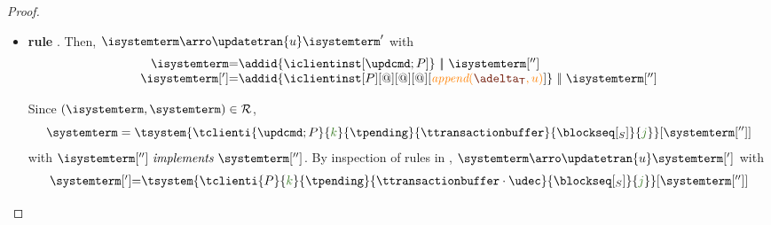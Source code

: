 \begin{proof}
\begin{itemize}
		
			
			\begin{itemize}
\item {\bf rule }. Then, $\isystemterm  \arroi{\updatetran{u}} \isystemterm '$ with 
				\[\begin{array}{r@{=}l}
					\isystemterm & \addid{\iclientinst[\tupdateins]} \ \bigpar \ \isystemterm['']
					\\
					\isystemterm['] & \addid{\iclientinst[P][@][@][@][\iappend{\transactionbuffer}{u}]} \ \bigpar \   \isystemterm['']	
				  \end{array}
				\]
				
				Since $(\isystemterm,\systemterm)\in \mathcal{R}$,
				\[\systemterm = \tsystem{\tclienti{\tupdateins}{\tknown}{\tpending}{\ttransactionbuffer}{\tsent}{\treceivebuffer}}[{\systemterm['']}] \]
				with $\implements{\isystemterm['']}{\systemterm['']}$. By inspection of rules in , 
				$\systemterm \arroi{\updatetran{u}} \systemterm[']$ with
				\[\begin{array}{r@{=}l}
						\systemterm['] & \tsystem{\tclienti{\tprogram}{\tknown}{\tpending}{\ttransactionbuffer \cdot \tupdate}{\tsent}{\treceivebuffer}}[{\systemterm['']}]	
				  \end{array}		
				\]
				

\end{itemize}
\end{itemize}
\end{proof}
